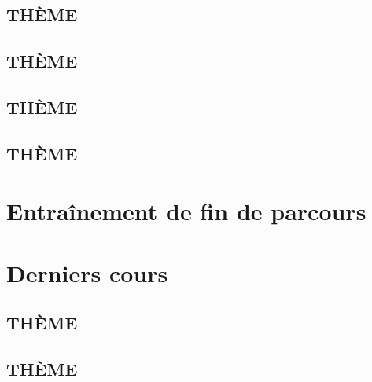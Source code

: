 \documentclass[poly,trombi]{valbonne}
\begin{document}
\subsection{THÈME}


\subsection{THÈME}


\subsection{THÈME}


\subsection{THÈME}






\section{Entraînement de fin de parcours}







\section{Derniers cours}

\subsection{THÈME}


\subsection{THÈME}




\end{document}
